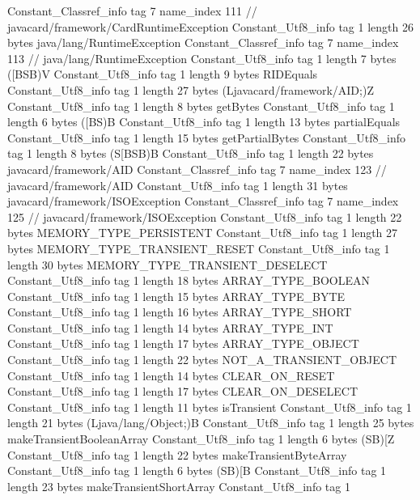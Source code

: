 {{{		}
		Constant_Classref_info {
			tag	7
			name_index	111		// javacard/framework/CardRuntimeException
		}
		Constant_Utf8_info {
			tag	1
			length	26
			bytes	java/lang/RuntimeException
		}
		Constant_Classref_info {
			tag	7
			name_index	113		// java/lang/RuntimeException
		}
		Constant_Utf8_info {
			tag	1
			length	7
			bytes	([BSB)V
		}
		Constant_Utf8_info {
			tag	1
			length	9
			bytes	RIDEquals
		}
		Constant_Utf8_info {
			tag	1
			length	27
			bytes	(Ljavacard/framework/AID;)Z
		}
		Constant_Utf8_info {
			tag	1
			length	8
			bytes	getBytes
		}
		Constant_Utf8_info {
			tag	1
			length	6
			bytes	([BS)B
		}
		Constant_Utf8_info {
			tag	1
			length	13
			bytes	partialEquals
		}
		Constant_Utf8_info {
			tag	1
			length	15
			bytes	getPartialBytes
		}
		Constant_Utf8_info {
			tag	1
			length	8
			bytes	(S[BSB)B
		}
		Constant_Utf8_info {
			tag	1
			length	22
			bytes	javacard/framework/AID
		}
		Constant_Classref_info {
			tag	7
			name_index	123		// javacard/framework/AID
		}
		Constant_Utf8_info {
			tag	1
			length	31
			bytes	javacard/framework/ISOException
		}
		Constant_Classref_info {
			tag	7
			name_index	125		// javacard/framework/ISOException
		}
		Constant_Utf8_info {
			tag	1
			length	22
			bytes	MEMORY_TYPE_PERSISTENT
		}
		Constant_Utf8_info {
			tag	1
			length	27
			bytes	MEMORY_TYPE_TRANSIENT_RESET
		}
		Constant_Utf8_info {
			tag	1
			length	30
			bytes	MEMORY_TYPE_TRANSIENT_DESELECT
		}
		Constant_Utf8_info {
			tag	1
			length	18
			bytes	ARRAY_TYPE_BOOLEAN
		}
		Constant_Utf8_info {
			tag	1
			length	15
			bytes	ARRAY_TYPE_BYTE
		}
		Constant_Utf8_info {
			tag	1
			length	16
			bytes	ARRAY_TYPE_SHORT
		}
		Constant_Utf8_info {
			tag	1
			length	14
			bytes	ARRAY_TYPE_INT
		}
		Constant_Utf8_info {
			tag	1
			length	17
			bytes	ARRAY_TYPE_OBJECT
		}
		Constant_Utf8_info {
			tag	1
			length	22
			bytes	NOT_A_TRANSIENT_OBJECT
		}
		Constant_Utf8_info {
			tag	1
			length	14
			bytes	CLEAR_ON_RESET
		}
		Constant_Utf8_info {
			tag	1
			length	17
			bytes	CLEAR_ON_DESELECT
		}
		Constant_Utf8_info {
			tag	1
			length	11
			bytes	isTransient
		}
		Constant_Utf8_info {
			tag	1
			length	21
			bytes	(Ljava/lang/Object;)B
		}
		Constant_Utf8_info {
			tag	1
			length	25
			bytes	makeTransientBooleanArray
		}
		Constant_Utf8_info {
			tag	1
			length	6
			bytes	(SB)[Z
		}
		Constant_Utf8_info {
			tag	1
			length	22
			bytes	makeTransientByteArray
		}
		Constant_Utf8_info {
			tag	1
			length	6
			bytes	(SB)[B
		}
		Constant_Utf8_info {
			tag	1
			length	23
			bytes	makeTransientShortArray
		}
		Constant_Utf8_info {
			tag	1
}}}
